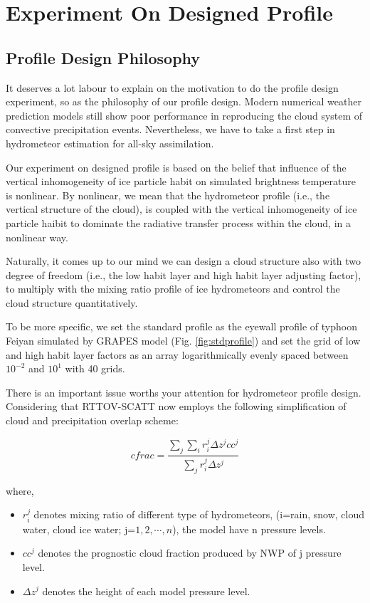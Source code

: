 \chapter{Experiment On Designed Profile}

\section{Profile Design Philosophy}
It deserves a lot labour to explain on the motivation to do the profile design experiment,
so as the philosophy of our profile design. Modern numerical weather prediction models still show
poor performance in reproducing the cloud system of convective precipitation events. 
Nevertheless, we have to take a first step in hydrometeor estimation for all-sky assimilation.

Our experiment on designed profile is based on the belief that influence of the vertical inhomogeneity 
of ice particle habit on simulated brightness temperature is nonlinear. By nonlinear, we mean that 
the hydrometeor profile (i.e., the vertical structure of the cloud), is coupled with the vertical inhomogeneity 
of ice particle haibit to dominate the radiative transfer process within the cloud, in a nonlinear way.

Naturally, it comes up to our mind we can design a cloud structure also with two degree of freedom (i.e., 
the low habit layer and high habit layer adjusting factor), to multiply with the mixing ratio profile of
ice hydrometeors and control the cloud structure quantitatively.

To be more specific, we set the standard profile as the eyewall profile of typhoon Feiyan 
simulated by GRAPES model (Fig. \ref{fig:stdprofile}) and set the grid of low and high habit layer factors 
as an array logarithmically evenly spaced between $10^{-2}$ and $10^{1}$ with 40 grids.

There is an important issue worths your attention for hydrometeor profile design.
Considering that RTTOV-SCATT now employs the following simplification of cloud and precipitation overlap scheme:

\begin{equation} \label{eq:cloudoverlap}
    cfrac = \frac{\sum_{j}\sum_{i}r_{i}^{j} \Delta z^{j} cc^{j}}
    {\sum_{j}r_{i}^{j} \Delta z^{j}}
\end{equation}

where,

\begin{itemize}
    \item $r_{i}^{j}$ denotes mixing ratio of different type of hydrometeors, 
    (i=rain, snow, cloud water, cloud ice water; j=$1, 2, \cdots, n$), the model have n pressure levels.

    \item $cc^{j}$ denotes the prognostic cloud fraction produced by NWP of j pressure level.

    \item $\Delta z^{j}$ denotes the height of each model pressure level.
\end{itemize}

